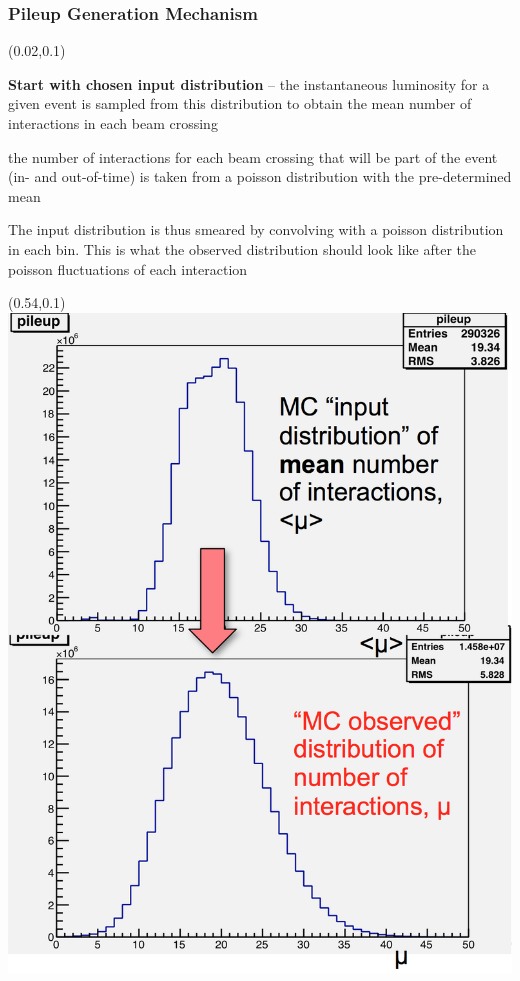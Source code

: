 \begin{frame}[t]\frametitle{Pileup Generation Mechanism}
	\begin{textblock}{0.5}(0.02,0.1)
		\begin{block}{}
			\begin{customlist}{2.5em}{0em}
		    	\item \textbf{Start with chosen input distribution} -- the instantaneous luminosity for a given event is sampled from this distribution to obtain the mean number of interactions in each beam crossing
			    \item the number of interactions for each beam crossing that will be part of the event (in- and out-of-time) is taken from a poisson distribution with the pre-determined mean
			    \begin{customlist}{2.5em}{0em}
			       \item The input distribution is thus smeared by convolving with a poisson distribution in each bin. This is what the {\color{maroon}observed distribution} should look like after the poisson fluctuations of each interaction
			    \end{customlist}
			\end{customlist}			
		\end{block}
	\end{textblock}
	\begin{textblock}{0.46}(0.54,0.1)
		\includegraphics[width=\textwidth]{images/pileup_reweighting/pr_1.png}
	\end{textblock}
\end{frame}

